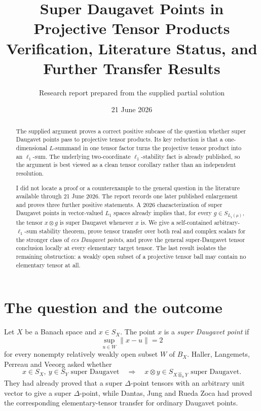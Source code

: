 \documentclass[11pt]{article}
\title{Super Daugavet Points in Projective Tensor Products\\
\large Verification, Literature Status, and Further Transfer Results}
\author{Research report prepared from the supplied partial solution}
\date{21 June 2026}
\theoremstyle{definition}
\newcommand{\whotpi}{\widehat{\otimes}_{\pi}}
\begin{document}
\maketitle

\begin{abstract}
The supplied argument proves a correct positive subcase of the question whether
super Daugavet points pass to projective tensor products.  Its key reduction is
that a one-dimensional $L$-summand in one tensor factor turns the projective
tensor product into an $\ell_1$-sum.  The underlying two-coordinate
$\ell_1$-stability fact is already published, so the argument is best viewed as
a clean tensor corollary rather than an independent resolution.

I did not locate a proof or a counterexample to the general question in the
literature available through 21 June 2026.  The report records one later
published enlargement and proves three further positive statements.  A 2026
characterization of super Daugavet points in vector-valued $L_1$ spaces already
implies that, for every $g\in S_{L_1(\mu)}$, the tensor $x\otimes g$ is super
Daugavet whenever $x$ is.  We give a self-contained arbitrary-$\ell_1$-sum
stability theorem, prove tensor transfer over both real and complex scalars for
the stronger class of \emph{ccs Daugavet points}, and prove the general
super-Daugavet tensor conclusion locally at every elementary target tensor.
The last result isolates the remaining obstruction: a weakly open subset of a
projective tensor ball may contain no elementary tensor at all.
\end{abstract}

\section{The question and the outcome}

Let $X$ be a Banach space and $x\in S_X$.  The point $x$ is a
\emph{super Daugavet point} if
\[
  \sup_{u\in W}\|x-u\|=2
\]
for every nonempty relatively weakly open subset $W$ of $B_X$.
Haller, Langemets, Perreau and Veeorg asked whether
\begin{equation}\label{eq:main-question}
  x\in S_X,\ y\in S_Y\text{ super Daugavet}
  \quad\Longrightarrow\quad
  x\otimes y\in S_{X\whotpi Y}\text{ super Daugavet}.
\end{equation}
They had already proved that a super $\Delta$-point tensors with an arbitrary
unit vector to give a super $\Delta$-point, while Dantas, Jung and Rueda Zoca
had proved the corresponding elementary-tensor transfer for ordinary
Daugavet points.
\end{document}
